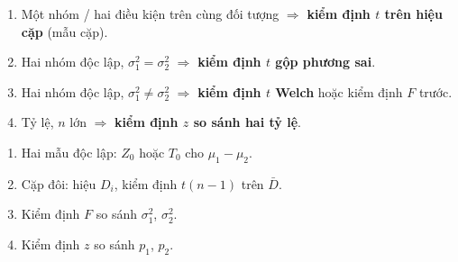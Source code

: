 \documentclass[12pt,a4paper]{article}
\begin{document}
\begin{phuongphap}[title={Chọn kiểm định hai mẫu}]
\begin{enumerate}
  \item Một nhóm / hai điều kiện trên cùng đối tượng $\Rightarrow$ \textbf{kiểm định $t$ trên hiệu cặp} (mẫu cặp).
  \item Hai nhóm độc lập, $\sigma_1^2=\sigma_2^2$ $\Rightarrow$ \textbf{kiểm định $t$ gộp phương sai}.
  \item Hai nhóm độc lập, $\sigma_1^2 \ne \sigma_2^2$ $\Rightarrow$ \textbf{kiểm định $t$ Welch} hoặc kiểm định $F$ trước.
  \item Tỷ lệ, $n$ lớn $\Rightarrow$ \textbf{kiểm định $z$ so sánh hai tỷ lệ}.
\end{enumerate}
\end{phuongphap}

\begin{tongket}[title={Tổng kết}]
\begin{enumerate}
  \item Hai mẫu độc lập: $Z_0$ hoặc $T_0$ cho $\mu_1-\mu_2$.
  \item Cặp đôi: hiệu $D_i$, kiểm định $t(n-1)$ trên $\bar{D}$.
  \item Kiểm định $F$ so sánh $\sigma_1^2$, $\sigma_2^2$.
  \item Kiểm định $z$ so sánh $p_1$, $p_2$.
\end{enumerate}
\end{tongket}
\end{document}
